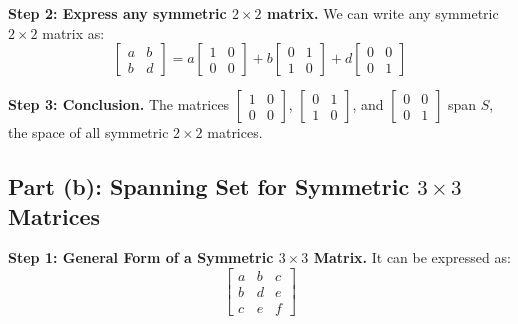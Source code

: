 \documentclass[12pt]{article}
\begin{document}
\textbf{Step 2: Express any symmetric \(2 \times 2\) matrix.} We can write any symmetric \(2 \times 2\) matrix as:
\[
\begin{bmatrix} a & b \\ b & d \end{bmatrix} = a \begin{bmatrix} 1 & 0 \\ 0 & 0 \end{bmatrix} + b \begin{bmatrix} 0 & 1 \\ 1 & 0 \end{bmatrix} + d \begin{bmatrix} 0 & 0 \\ 0 & 1 \end{bmatrix}
\]

\textbf{Step 3: Conclusion.} The matrices \(\begin{bmatrix} 1 & 0 \\ 0 & 0 \end{bmatrix}\), \(\begin{bmatrix} 0 & 1 \\ 1 & 0 \end{bmatrix}\), and \(\begin{bmatrix} 0 & 0 \\ 0 & 1 \end{bmatrix}\) span \(S\), the space of all symmetric \(2 \times 2\) matrices.

\subsection*{Part (b): Spanning Set for Symmetric \(3 \times 3\) Matrices}
\textbf{Step 1: General Form of a Symmetric \(3 \times 3\) Matrix.} It can be expressed as:
\[
\begin{bmatrix}
a & b & c \\
b & d & e \\
c & e & f
\end{bmatrix}
\]
\end{document}
